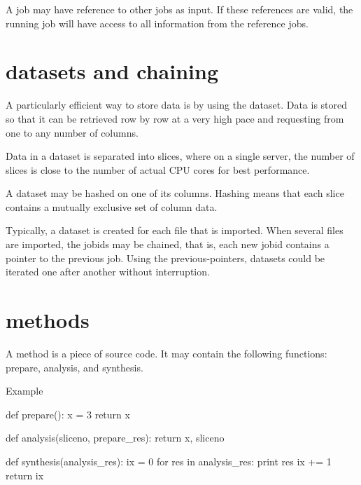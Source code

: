 A job may have reference to other jobs as input.  If these references
are valid, the running job will have access to all information from
the reference jobs.



\section{datasets and chaining}
A particularly efficient way to store data is by using the dataset.
Data is stored so that it can be retrieved row by row at a very high
pace and requesting from one to any number of columns.

Data in a dataset is separated into slices, where on a single server,
the number of slices is close to the number of actual CPU cores for
best performance.

A dataset may be hashed on one of its columns.  Hashing means that
each slice contains a mutually exclusive set of column data.

Typically, a dataset is created for each file that is imported.  When
several files are imported, the jobids may be chained, that is, each
new jobid contains a pointer to the previous job.  Using the
previous-pointers, datasets could be iterated one after another
without interruption.



\section{methods}
A method is a piece of source code.  It may contain the following
functions:  prepare, analysis, and synthesis.

Example

\begin{python}
def prepare():
  x = 3
  return x

def analysis(sliceno, prepare_res):
  return x, sliceno
  
def synthesis(analysis_res):
  ix = 0
  for res in analysis_res:
    print res
    ix += 1
  return ix
\end{python}

